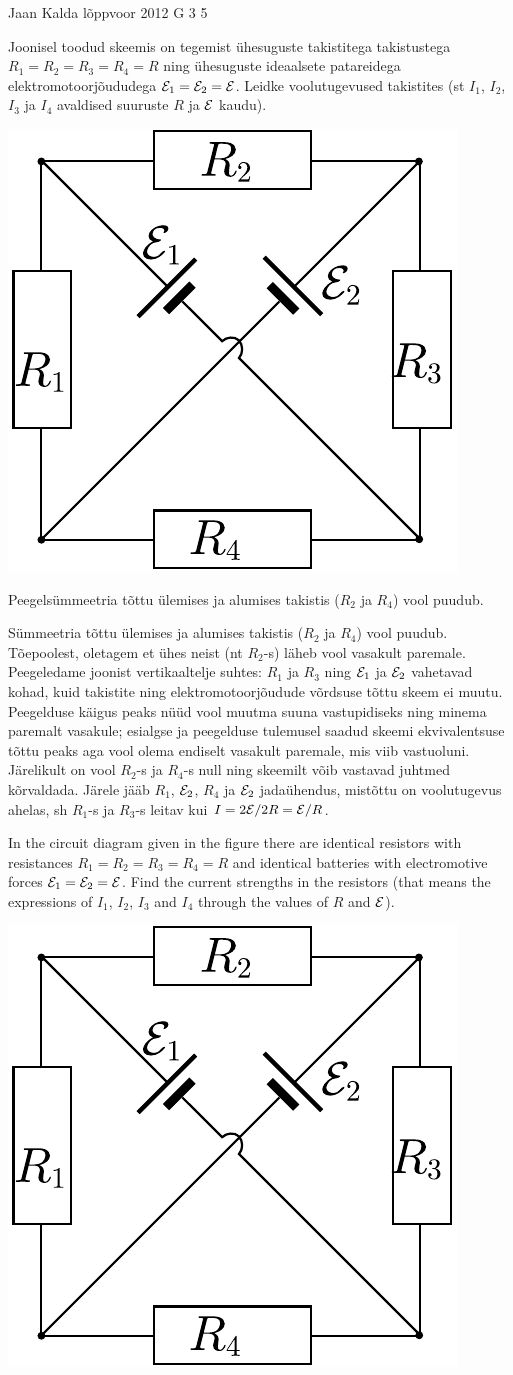 {Jaan Kalda} %
{lõppvoor} %
{2012} %
{G 3} %
{5} %
{
\ifStatement
Joonisel toodud skeemis on tegemist ühesuguste takistitega takistustega $R_1 = R_2 = R_3 = R_4 = R$ ning ühesuguste
ideaalsete patareidega elektromotoorjõududega ${\cal E}_1 = {\cal E}_2
= {\cal E}$. Leidke voolutugevused takistites (st $I_1$, $I_2$, $I_3$ ja
$I_4$ avaldised suuruste $R$ ja ${\cal E}$ kaudu).

\begin{center}
\includegraphics[width=0.35\linewidth]{2012-v3g-03-elektriline_sild}%
\end{center}
\fi


\ifHint
Peegelsümmeetria tõttu ülemises ja alumises takistis ($R_2$ ja $R_4$) vool puudub. 
\fi


\ifSolution
Sümmeetria tõttu ülemises ja alumises takistis ($R_2$ ja $R_4$) vool puudub. 
Tõepoolest, oletagem et ühes neist (nt $R_2$-s) läheb vool vasakult paremale. Peegeledame joonist vertikaaltelje
suhtes: $R_1$ ja $R_3$ ning ${\cal E}_1$ ja ${\cal E}_2$ vahetavad kohad, 
kuid takistite ning elektromotoorjõudude võrdsuse tõttu skeem ei muutu. Peegelduse käigus 
peaks nüüd vool muutma suuna vastupidiseks ning minema paremalt vasakule; esialgse ja 
peegelduse tulemusel saadud skeemi ekvivalentsuse tõttu peaks aga vool olema endiselt vasakult paremale,
mis viib vastuoluni. Järelikult on vool $R_2$-s ja $R_4$-s null ning skeemilt võib vastavad juhtmed kõrvaldada.
Järele jääb $R_1$, ${\cal E}_2$, $R_4$ ja ${\cal E}_2$ jadaühendus, mistõttu on voolutugevus ahelas, sh $R_1$-s ja $R_3$-s
leitav kui $I=2{\cal E}/2R = {\cal E}/R$.
\fi


\ifEngStatement
In the circuit diagram given in the figure there are identical resistors with resistances $R_1 = R_2 = R_3 = R_4 = R$ and identical batteries with electromotive forces ${\cal E}_1 = {\cal E}_2
= {\cal E}$. Find the current strengths in the resistors (that means the expressions of $I_1$, $I_2$, $I_3$ and $I_4$ through the values of $R$ and ${\cal E}$).
\begin{center}
\includegraphics[width=0.35\linewidth]{2012-v3g-03-elektriline_sild}%
\end{center}
\fi


}
